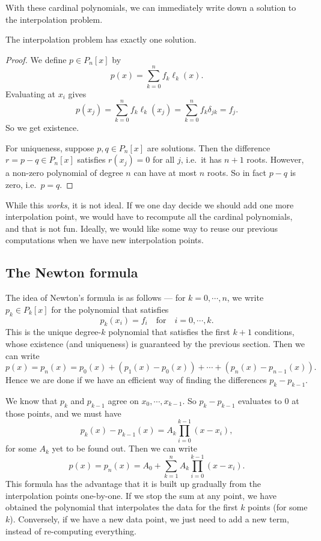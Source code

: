 \documentclass[a4paper]{article}
\begin{document}
With these cardinal polynomials, we can immediately write down a solution to the interpolation problem.
\begin{thm}
  The interpolation problem has exactly one solution.
\end{thm}

\begin{proof}
  We define $p \in P_n[x]$ by
  \[
    p(x) = \sum_{k = 0}^n f_k \ell_k (x).
  \]
  Evaluating at $x_i$ gives
  \[
    p(x_j) = \sum_{k = 0}^n f_k \ell_k(x_j) = \sum_{k = 0}^n f_k \delta_{jk} = f_j.
  \]
  So we get existence.

  For uniqueness, suppose $p, q \in P_n[x]$ are solutions. Then the difference $r = p - q \in P_n[x]$ satisfies $r(x_j) = 0$ for all $j$, i.e.\ it has $n + 1$ roots. However, a non-zero polynomial of degree $n$ can have at most $n$ roots. So in fact $p - q$ is zero, i.e.\ $p = q$.
\end{proof}

While this \emph{works}, it is not ideal. If we one day decide we should add one more interpolation point, we would have to recompute all the cardinal polynomials, and that is not fun. Ideally, we would like some way to reuse our previous computations when we have new interpolation points.

\subsection{The Newton formula}
The idea of Newton's formula is as follows --- for $k = 0, \cdots, n$, we write $p_k \in P_k[x]$ for the polynomial that satisfies
\[
  p_k(x_i) = f_i\quad\text{for}\quad i = 0, \cdots, k.
\]
This is the unique degree-$k$ polynomial that satisfies the first $k + 1$ conditions, whose existence (and uniqueness) is guaranteed by the previous section. Then we can write
\[
  p(x) = p_n(x) = p_0(x) + (p_1(x) - p_0(x)) + \cdots + (p_n(x) - p_{n - 1}(x)).
\]
Hence we are done if we have an efficient way of finding the differences $p_k - p_{k - 1}$.

We know that $p_k$ and $p_{k - 1}$ agree on $x_0, \cdots, x_{k - 1}$. So $p_k - p_{k - 1}$ evaluates to $0$ at those points, and we must have
\[
  p_k(x) - p_{k - 1}(x) = A_k \prod_{i = 0}^{k - 1}(x - x_i),
\]
for some $A_k$ yet to be found out. Then we can write
\[
  p(x) = p_n(x) = A_0 + \sum_{k = 1}^n A_k \prod_{i = 0}^{k - 1} (x - x_i).
\]
This formula has the advantage that it is built up gradually from the interpolation points one-by-one. If we stop the sum at any point, we have obtained the polynomial that interpolates the data for the first $k$ points (for some $k$). Conversely, if we have a new data point, we just need to add a new term, instead of re-computing everything.
\end{document}
